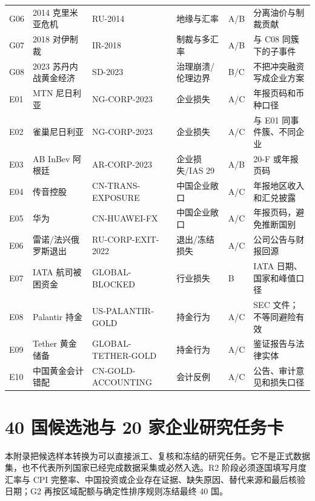 \documentclass[UTF8,12pt,openany]{ctexbook}
\begin{document}
\begin{landscape}
\begin{longtable}{p{1.1cm}p{5.1cm}p{3.0cm}p{3.0cm}p{2.0cm}p{4.0cm}}
G06 & 2014 克里米亚危机 & RU-2014 & 地缘与汇率 & A/B & 分离油价与制裁贡献\\
G07 & 2018 对伊制裁 & IR-2018 & 制裁与多汇率 & A/B & 与 C08 同簇下的子事件\\
G08 & 2023 苏丹内战黄金经济 & SD-2023 & 治理崩溃/伦理边界 & B/C & 不把冲突融资写成企业方案\\
\midrule
E01 & MTN 尼日利亚 & NG-CORP-2023 & 企业损失 & A/C & 年报页码和币种口径\\
E02 & 雀巢尼日利亚 & NG-CORP-2023 & 企业损失 & A/C & 与 E01 同事件簇、不同企业\\
E03 & AB InBev 阿根廷 & AR-CORP-2023 & 企业损失/IAS 29 & A/B & 20-F 或年报页码\\
E04 & 传音控股 & CN-TRANS-EXPOSURE & 中国企业敞口 & A/C & 年报地区收入和汇兑披露\\
E05 & 华为 & CN-HUAWEI-FX & 中国企业敞口 & A/C & 年报页码，避免推断国别\\
E06 & 雷诺/法兴俄罗斯退出 & RU-CORP-EXIT-2022 & 退出/冻结损失 & A/C & 公司公告与财报回源\\
E07 & IATA 航司被困资金 & GLOBAL-BLOCKED & 行业损失 & B & IATA 日期、国家和峰值口径\\
E08 & Palantir 持金 & US-PALANTIR-GOLD & 持金行为 & A/C & SEC 文件；不等同避险有效\\
E09 & Tether 黄金储备 & GLOBAL-TETHER-GOLD & 持金行为 & A/C & 鉴证报告与法律实体\\
E10 & 中国黄金会计错配 & CN-GOLD-ACCOUNTING & 会计反例 & A/C & 公告、审计意见和损失口径\\
\bottomrule
\end{longtable}
\end{landscape}

\chapter{40 国候选池与 20 家企业研究任务卡}
本附录把候选样本转换为可以直接派工、复核和冻结的研究任务。它不是正式数据集，也不代表所列国家已经完成数据采集或必然入选。R2 阶段必须逐国填写月度汇率与 CPI 完整率、中国投资或企业存在证据、缺失原因、替代来源和最后核验日期；G2 再按区域配额与确定性排序规则冻结最终 40 国。
\end{document}
